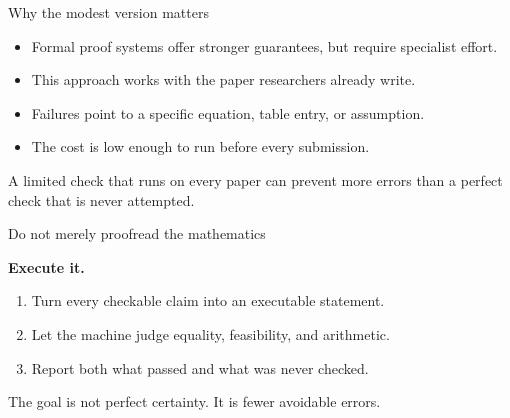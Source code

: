 \documentclass[aspectratio=169,11pt]{beamer}
\begin{document}
\begin{frame}{Why the modest version matters}
  \begin{itemize}\itemsep0.9em
    \item Formal proof systems offer stronger guarantees, but require specialist effort.
    \item This approach works with the paper researchers already write.
    \item Failures point to a specific equation, table entry, or assumption.
    \item The cost is low enough to run before every submission.
  \end{itemize}
  \vfill
  \begin{block}{}
    \centering\large
    A limited check that runs on every paper can prevent more errors than a perfect check that is never attempted.
  \end{block}
\end{frame}

\begin{frame}{Do not merely proofread the mathematics}
  \vfill
  \begin{center}
    {\fontsize{30}{36}\selectfont\bfseries Execute it.}
  \end{center}
  \vfill
  \begin{enumerate}\itemsep0.6em
    \item Turn every checkable claim into an executable statement.
    \item Let the machine judge equality, feasibility, and arithmetic.
    \item Report both what passed and what was never checked.
  \end{enumerate}
  \vfill
  \centering
  \alert{The goal is not perfect certainty. It is fewer avoidable errors.}
\end{frame}
\end{document}
